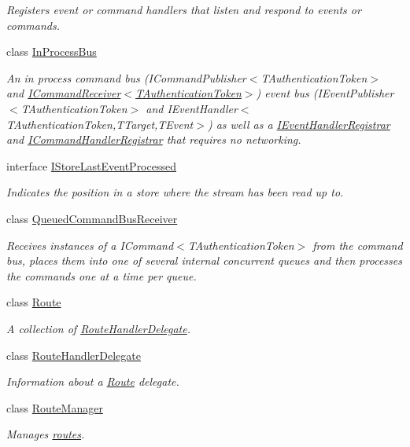 \begin{DoxyCompactItemize}
\begin{DoxyCompactList}\small\item\em Registers event or command handlers that listen and respond to events or commands. \end{DoxyCompactList}\item 
class \hyperlink{classCqrs_1_1Bus_1_1InProcessBus}{In\+Process\+Bus}
\begin{DoxyCompactList}\small\item\em An in process command bus (I\+Command\+Publisher$<$\+T\+Authentication\+Token$>$ and \hyperlink{interfaceCqrs_1_1Commands_1_1ICommandReceiver}{I\+Command\+Receiver$<$\+T\+Authentication\+Token$>$}) event bus (I\+Event\+Publisher$<$\+T\+Authentication\+Token$>$ and I\+Event\+Handler$<$\+T\+Authentication\+Token,\+T\+Target,\+T\+Event$>$) as well as a \hyperlink{interfaceCqrs_1_1Bus_1_1IEventHandlerRegistrar}{I\+Event\+Handler\+Registrar} and \hyperlink{interfaceCqrs_1_1Bus_1_1ICommandHandlerRegistrar}{I\+Command\+Handler\+Registrar} that requires no networking. \end{DoxyCompactList}\item 
interface \hyperlink{interfaceCqrs_1_1Bus_1_1IStoreLastEventProcessed}{I\+Store\+Last\+Event\+Processed}
\begin{DoxyCompactList}\small\item\em Indicates the position in a store where the stream has been read up to. \end{DoxyCompactList}\item 
class \hyperlink{classCqrs_1_1Bus_1_1QueuedCommandBusReceiver}{Queued\+Command\+Bus\+Receiver}
\begin{DoxyCompactList}\small\item\em Receives instances of a I\+Command$<$\+T\+Authentication\+Token$>$ from the command bus, places them into one of several internal concurrent queues and then processes the commands one at a time per queue. \end{DoxyCompactList}\item 
class \hyperlink{classCqrs_1_1Bus_1_1Route}{Route}
\begin{DoxyCompactList}\small\item\em A collection of \hyperlink{classCqrs_1_1Bus_1_1RouteHandlerDelegate}{Route\+Handler\+Delegate}. \end{DoxyCompactList}\item 
class \hyperlink{classCqrs_1_1Bus_1_1RouteHandlerDelegate}{Route\+Handler\+Delegate}
\begin{DoxyCompactList}\small\item\em Information about a \hyperlink{classCqrs_1_1Bus_1_1Route}{Route} delegate. \end{DoxyCompactList}\item 
class \hyperlink{classCqrs_1_1Bus_1_1RouteManager}{Route\+Manager}
\begin{DoxyCompactList}\small\item\em Manages \hyperlink{classCqrs_1_1Bus_1_1Route}{routes}. \end{DoxyCompactList}\end{DoxyCompactItemize}
